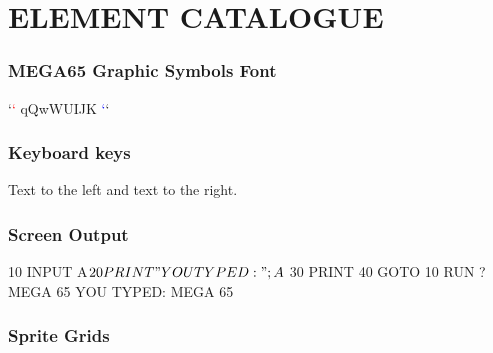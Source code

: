 %
%
%


\part{ELEMENT CATALOGUE}


\section{MEGA65 Graphic Symbols Font}
\begin{symbolfont}
	`\textcolor{red}{`} qQwWUIJK \textcolor{blue}{`}`
\end{symbolfont}

\section{Keyboard keys}


Text to the left  and text to the right.

     \megakey{ } 

 \megakey{*}  \megakey{$\leftarrow$} \megakey{$\uparrow$} \megakey{$\rightarrow$} \megakey{$\downarrow$}

\section{Screen Output}

\begin{screenoutput}
	10 INPUT A$
	20 PRINT "YOU TYPED: ";A$
	30 PRINT
	40 GOTO 10
	RUN
	? MEGA 65
	YOU TYPED: MEGA 65
\end{screenoutput}



\section{Sprite Grids}
